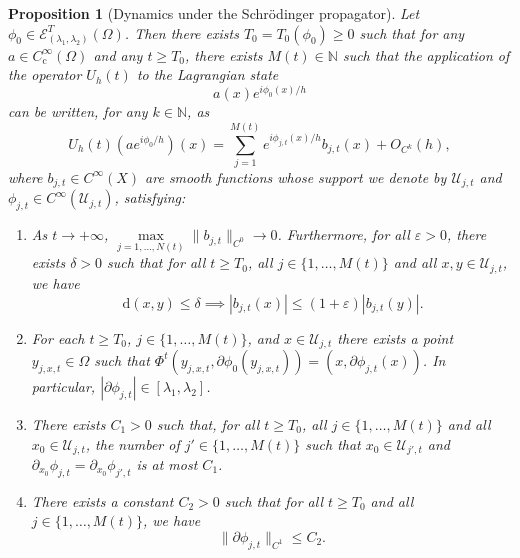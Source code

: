 \documentclass[10pt]{amsart}
\let\mathcal\mathscr
\newcommand{\rc}{\mathrm{c}}
\newcommand{\rd}{\,\mathrm{d}}
\theoremstyle{plain}
\newtheorem{proposition}[theorem]{Proposition}
\theoremstyle{definition}
\newcommand{\N}{\mathbb{N}}
\begin{document}
\skpt
\begin{proposition}[Dynamics under the Schrödinger propagator]\label{prop:SumLag3}
Let $\phi_0\in \mathcal{E}^{T}_{(\lambda_1,\lambda_2)}(\Omega)$. Then there exists $T_0=T_0(\phi_0)\geq 0$ such that for any $a\in C_\rc^\infty(\Omega)$ and any $t\geq T_0$, there exists $M(t)\in \N$ such that the application of the operator $U_h(t)$ to the Lagrangian state
\begin{equation*}
a(x) e^{i\phi_0(x)/h}
\end{equation*}
can be written, for any $k\in \N$, as
\begin{equation}\label{eq:PropagLagSum2}
U_h(t) (a e^{i\phi_0/h})(x) = \sum_{j=1}^{M(t)} e^{i\phi_{j,t}(x)/h} b_{j,t}(x) +O_{C^k}(h),
\end{equation}
where $b_{j,t}\in C^\infty(X)$ are smooth functions whose support we denote by $\mathcal{U}_{j,t}$ and $\phi_{j,t}\in C^{\infty}(\mathcal{U}_{j,t})$, satisfying:
\begin{enumerate}
\item As $t\to +\infty$, $\max\limits_{j=1,\dots, N(t)} \|b_{j,t}\|_{C^0}\to 0$. Furthermore, for all $\varepsilon>0$, there exists $\delta>0$ such that for all $t\geq T_0$, all $j\in \{1,\dots, M(t)\}$ and all $x,y\in \mathcal{U}_{j,t}$, we have
\begin{equation}\label{eq:LaBorneLog}
\rd (x,y)\leq \delta \implies |b_{j,t}(x)|\leq (1+\varepsilon) |b_{j,t}(y)|.
\end{equation}
\item For each $t\geq T_0$, $j \in\{1,\dots,M(t)\}$, and $x\in \mathcal{U}_{j,t}$ there exists a point $y_{j,x,t}\in \Omega$ such that $\Phi^t(y_{j,x,t}, \partial \phi_0(y_{j,x,t})) = (x, \partial \phi_{j,t}(x))$. In particular,
$|\partial\phi_{j,t}|\in [\lambda_1,\lambda_2]$.

\item There exists $C_1>0$ such that, for all $t\geq T_0$, all $j\in\{1,\dots,M(t)\}$ and all $x_0\in \mathcal{U}_{j,t}$, the number of $j'\in \{1,\dots,M(t)\}$ such that $x_0\in \mathcal{U}_{j',t}$ and $\partial _{x_0} \phi_{j,t} = \partial _{x_0} \phi_{j',t}$ is at most $C_1$.

\item There exists a constant $C_2>0$ such that for all $t\geq T_0$ and all $j\in\{1,\dots,M(t)\}$, we have
\begin{equation}\label{eq:phase_bound}
\|\partial\phi_{j,t}\|_{C^1}\leq C_2.
\end{equation}
\end{enumerate}
\end{proposition}
\end{document}
